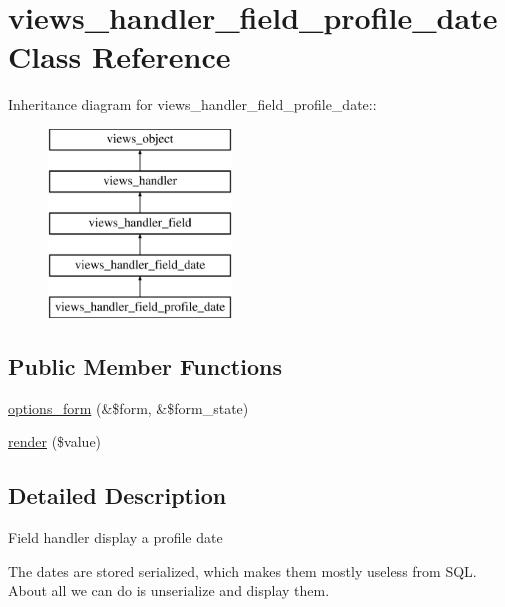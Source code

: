 \hypertarget{classviews__handler__field__profile__date}{
\section{views\_\-handler\_\-field\_\-profile\_\-date Class Reference}
\label{classviews__handler__field__profile__date}
}
Inheritance diagram for views\_\-handler\_\-field\_\-profile\_\-date::\begin{figure}[H]
\begin{center}
\leavevmode
\includegraphics[height=5cm]{classviews__handler__field__profile__date}
\end{center}
\end{figure}
\subsection*{Public Member Functions}
\begin{CompactItemize}
\item 
\hyperlink{classviews__handler__field__profile__date_ede3f5f93411ff64dd780b9837d19aec}{options\_\-form} (\&\$form, \&\$form\_\-state)
\item 
\hyperlink{classviews__handler__field__profile__date_63151e2577405b9fec938ed9ff5926d4}{render} (\$value)
\end{CompactItemize}


\subsection{Detailed Description}
Field handler display a profile date

The dates are stored serialized, which makes them mostly useless from SQL. About all we can do is unserialize and display them. 

